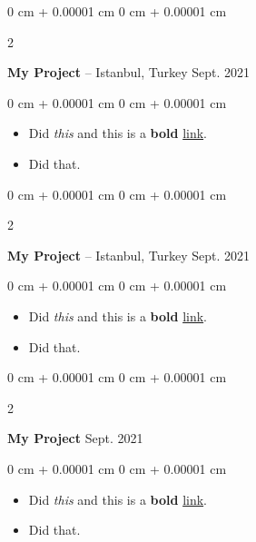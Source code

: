 \documentclass[10pt, letterpaper]{article}
\newenvironment{highlights}{
    \begin{itemize}[
        topsep=0.10 cm,
        parsep=0.10 cm,
        partopsep=0pt,
        itemsep=0pt,
        leftmargin=0 cm + 10pt
    ]
}{
    \end{itemize}
} %
\newenvironment{onecolentry}{
    \begin{adjustwidth}{
        0 cm + 0.00001 cm
    }{
        0 cm + 0.00001 cm
    }
}{
    \end{adjustwidth}
} %
\newenvironment{twocolentry}[2][]{
    \onecolentry
    \def\secondColumn{#2}
    \setcolumnwidth{\fill, 4.5 cm}
    \begin{paracol}{2}
}{
    \switchcolumn \raggedleft \secondColumn
    \end{paracol}
    \endonecolentry
} %
\begin{document}
        \vspace{0.2 cm}

        \begin{twocolentry}{
            Sept. 2021
        }
            \textbf{My Project} -- Istanbul, Turkey\end{twocolentry}

        \vspace{0.10 cm}
        \begin{onecolentry}
            \begin{highlights}
                \item Did \textit{this} and this is a \textbf{bold} \href{https://example.com}{link}.
                \item Did that.
            \end{highlights}
        \end{onecolentry}


        \vspace{0.2 cm}

        \begin{twocolentry}{
            Sept. 2021
        }
            \textbf{My Project} -- Istanbul, Turkey\end{twocolentry}

        \vspace{0.10 cm}
        \begin{onecolentry}
            \begin{highlights}
                \item Did \textit{this} and this is a \textbf{bold} \href{https://example.com}{link}.
                \item Did that.
            \end{highlights}
        \end{onecolentry}


        \vspace{0.2 cm}

        \begin{twocolentry}{
            Sept. 2021
        }
            \textbf{My Project}\end{twocolentry}

        \vspace{0.10 cm}
        \begin{onecolentry}
            \begin{highlights}
                \item Did \textit{this} and this is a \textbf{bold} \href{https://example.com}{link}.
                \item Did that.
            \end{highlights}
        \end{onecolentry}
\end{document}
